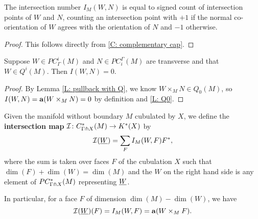 \begin{lemma}\label{L: intersection number}
	The intersection number $I_M(W,N)$ is equal to signed count of intersection points of $W$ and $N$, counting an intersection point with $+1$ if the normal co-orientation of $W$ agrees with the orientation of $N$ and $-1$ otherwise.
\end{lemma}

\begin{proof}
	This follows directly from \cref{C: complementary cap}.
	\begin{comment}
		We first recall the construction of the pullback orientation $W \times_M N \to N$.
		As $W$ and $N$ are immersed near their geometric intersections, we can restrict to these immersed regions of $W$ and $N$ and so take the dimension of the Euclidean factor to be $0$ in Definition \ref{D: pullback coorient}.
		So then $\nu W$ is the oriented normal bundle of $W$ determined by the co-orientation in the immersed region, and we pull this back to be a normal bundle of $W \times_M N$ in $N$.
		In this simplified situation, Definition \ref{D: pullback coorient} tells us that the co-orientation of the pullback is the normal co-orientation corresponding to this pullback bundle, which is just the restriction of the normal bundle to the intersection point.
		So the co-orientation at each intersection point can be written as $(1,1 \wedge \beta_{\nu W}) = (1, \beta_{\nu W})$.
		So now by the discussion following Definition \ref{D: co-orientations}, we orient each point of the pullback by $1$ if $\beta_{\nu W}$ agrees with the orientation of $N$ and $-1$ otherwise.
		The lemma follows.
	\end{comment}
\end{proof}

\begin{lemma}\label{L: Q-trivial intersection}
	Suppose $W \in PC_\Gamma^i(M)$ and $N \in PC_{i}^\Gamma(M)$ are transverse and that $W \in Q^i(M)$.
	Then $I(W,N) = 0$.
\end{lemma}

\begin{proof}
	By Lemma \ref{L: pullback with Q}, we know $W \times_M N \in Q_0(M)$, so $I(W,N) = \mathbf{a}(W \times_M N) = 0$ by definition and \cref{L: Q0}.
\end{proof}

\begin{definition}\label{D: intersection homomorphism}
	Given the manifold without boundary $M$ cubulated by $X$, we define the \textbf{intersection map} $\mathcal{I} \colon C^*_{\Gamma \pitchfork X}(M) \to K^*(X)$ by $$\mathcal{I}(\underline{W}) = \sum_F I_M(W,F)F^*,$$ where the sum is taken over faces $F$ of the cubulation $X$ such that $\dim(F)+\dim(W) = \dim(M)$ and the $W$ on the right hand side is any element of $PC^*_{\Gamma \pitchfork X}(M)$ representing $\underline{W}$.

	In particular, for a face $F$ of dimension $\dim(M)-\dim(W)$, we have $$\mathcal{I}(\underline{W})(F) = I_M(W,F) = \mathbf{a}(W \times_M F).$$
\end{definition}

